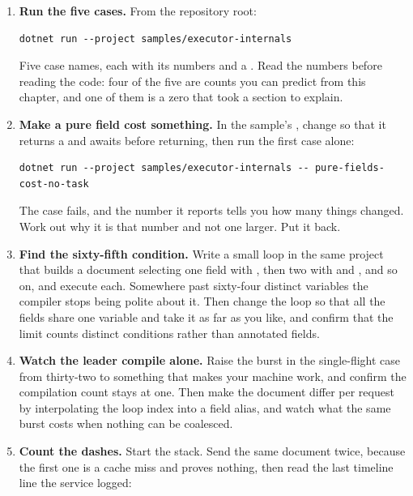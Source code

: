 \begin{enumerate}
  \item \textbf{Run the five cases.} From the repository root:

  \begin{verbatim}
dotnet run --project samples/executor-internals
  \end{verbatim}

  Five case names, each with its numbers and a . Read the numbers
  before reading the code: four of the five are counts you can predict from this
  chapter, and one of them is a zero that took a section to explain.

  \item \textbf{Make a pure field cost something.} In the sample's
  , change  so that it returns a
   and awaits  before returning, then run
  the first case alone:

  \begin{verbatim}
dotnet run --project samples/executor-internals -- pure-fields-cost-no-task
  \end{verbatim}

  The case fails, and the number it reports tells you how many things changed.
  Work out why it is that number and not one larger. Put it back.

  \item \textbf{Find the sixty-fifth condition.} Write a small loop in the same
  project that builds a document selecting one field with
  , then two with  and , and so on,
  and execute each. Somewhere past sixty-four distinct variables the compiler
  stops being polite about it. Then change the loop so that all the fields share
  one variable and take it as far as you like, and confirm that the limit counts
  distinct conditions rather than annotated fields.

  \item \textbf{Watch the leader compile alone.} Raise the burst in the
  single-flight case from thirty-two to something that makes your machine work,
  and confirm the compilation count stays at one. Then make the document differ
  per request by interpolating the loop index into a field alias, and watch what
  the same burst costs when nothing can be coalesced.

  \item \textbf{Count the dashes.} Start the stack. Send the same document
  twice, because the first one is a cache miss and proves nothing, then read the
  last timeline line the service logged:


\end{enumerate}
